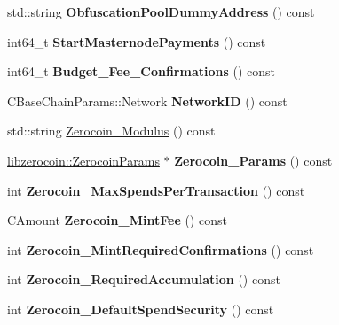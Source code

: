 \begin{DoxyCompactItemize}
std\+::string {\bfseries Obfuscation\+Pool\+Dummy\+Address} () const
\item 
\mbox{\label{class_c_chain_params_af732a05c80cf79a71b0f6bc5ce113c98}} 
int64\+\_\+t {\bfseries Start\+Masternode\+Payments} () const
\item 
\mbox{\label{class_c_chain_params_affd375d849ab3faefea3301b9ecbdf6b}} 
int64\+\_\+t {\bfseries Budget\+\_\+\+Fee\+\_\+\+Confirmations} () const
\item 
\mbox{\label{class_c_chain_params_a3af50135596ad86019f274c8a15e580f}} 
C\+Base\+Chain\+Params\+::\+Network {\bfseries Network\+ID} () const
\item 
std\+::string \mbox{\hyperlink{class_c_chain_params_af6003afc48876c16e825f589eed0ff11}{Zerocoin\+\_\+\+Modulus}} () const
\item 
\mbox{\label{class_c_chain_params_a630db503e18106a7b797cdfe0a184437}} 
\mbox{\hyperlink{classlibzerocoin_1_1_zerocoin_params}{libzerocoin\+::\+Zerocoin\+Params}} $\ast$ {\bfseries Zerocoin\+\_\+\+Params} () const
\item 
\mbox{\label{class_c_chain_params_a9c9564cce9a2852ec277560c03c7bf5f}} 
int {\bfseries Zerocoin\+\_\+\+Max\+Spends\+Per\+Transaction} () const
\item 
\mbox{\label{class_c_chain_params_a68324f698999844cf8bdb511ab5bf89a}} 
C\+Amount {\bfseries Zerocoin\+\_\+\+Mint\+Fee} () const
\item 
\mbox{\label{class_c_chain_params_a76f3eaab883c0359e8c0b2d6941ef39c}} 
int {\bfseries Zerocoin\+\_\+\+Mint\+Required\+Confirmations} () const
\item 
\mbox{\label{class_c_chain_params_ae0c16d94f2017bc9fe0ab558447b61ed}} 
int {\bfseries Zerocoin\+\_\+\+Required\+Accumulation} () const
\item 
\mbox{\label{class_c_chain_params_aae50ef1ebe703e91b9bef340e7557f24}} 
int {\bfseries Zerocoin\+\_\+\+Default\+Spend\+Security} () const
\item 

\end{DoxyCompactItemize}
